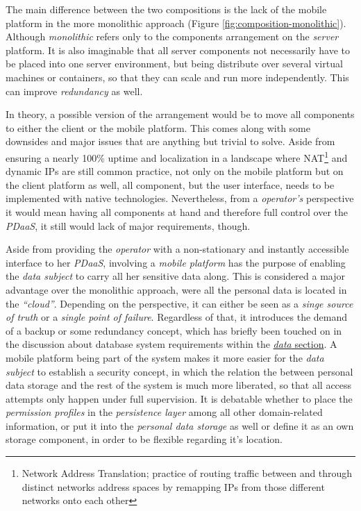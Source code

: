 \documentclass[12pt,english,a4paper,titlepage,cleardoublepage=empty,dottedtoc]{report}
\begin{document}
The main difference between the two compositions is the lack of the
mobile platform in the more monolithic approach (Figure
\ref{fig:composition-monolithic}). Although \emph{monolithic} refers
only to the components arrangement on the \emph{server} platform. It is
also imaginable that all server components not necessarily have to be
placed into one server environment, but being distribute over several
virtual machines or containers, so that they can scale and run more
independently. This can improve \emph{redundancy} as well.

In theory, a possible version of the arrangement would be to move all
components to either the client or the mobile platform. This comes along
with some downsides and major issues that are anything but trivial to
solve. Aside from ensuring a nearly 100\% uptime and localization in a
landscape where NAT\footnote{Network Address Translation; practice of
  routing traffic between and through distinct networks address spaces
  by remapping IPs from those different networks onto each other} and
dynamic IPs are still common practice, not only on the mobile platform
but on the client platform as well, all component, but the user
interface, needs to be implemented with native technologies.
Nevertheless, from a \emph{operator's} perspective it would mean having
all components at hand and therefore full control over the \emph{PDaaS},
it still would lack of major requirements, though.

Aside from providing the \emph{operator} with a non-stationary and
instantly accessible interface to her \emph{PDaaS}, involving a
\emph{mobile platform} has the purpose of enabling the \emph{data
subject} to carry all her sensitive data along. This is considered a
major advantage over the monolithic approach, were all the personal data
is located in the \emph{``cloud''}. Depending on the perspective, it can
either be seen as a \emph{singe source of truth} or a \emph{single point
of failure}. Regardless of that, it introduces the demand of a backup or
some redundancy concept, which has briefly been touched on in the
discussion about database system requirements within the
\protect\hyperlink{data}{\emph{data} section}. A mobile platform being
part of the system makes it more easier for the \emph{data subject} to
establish a security concept, in which the relation the between personal
data storage and the rest of the system is much more liberated, so that
all access attempts only happen under full supervision. It is debatable
whether to place the \emph{permission profiles} in the \emph{persistence
layer} among all other domain-related information, or put it into the
\emph{personal data storage} as well or define it as an own storage
component, in order to be flexible regarding it's location.
\end{document}

